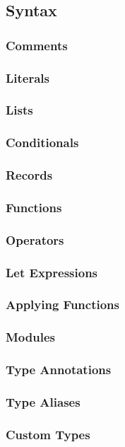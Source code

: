 \documentclass{viser-thesis}
\begin{document}
\subsection{Syntax}

\subsubsection{Comments}
\subsubsection{Literals}
\subsubsection{Lists}
\subsubsection{Conditionals}
\subsubsection{Records}
\subsubsection{Functions}
\subsubsection{Operators}
\subsubsection{Let Expressions}
\subsubsection{Applying Functions}
\subsubsection{Modules}
\subsubsection{Type Annotations}
\subsubsection{Type Aliases}
\subsubsection{Custom Types}
\end{document}
